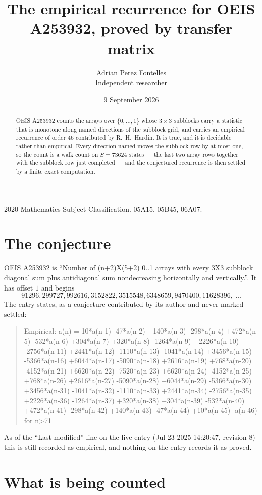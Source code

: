 \documentclass[11pt,a4paper]{article}
\title{The empirical recurrence for OEIS A253932, proved by transfer matrix}
\author{Adrian Perez Fontelles\\ \small Independent researcher}
\date{9 September 2026}
\theoremstyle{plain}
\theoremstyle{definition}
\begin{document}
\maketitle

\begin{abstract}
OEIS A253932 counts the arrays over $\{0,\dots,1\}$ whose $3\times3$ subblocks carry a
statistic that is monotone along named directions of the subblock grid, and carries an
empirical recurrence of order $46$ contributed by R.~H.~Hardin. It is true, and it is
decidable rather than empirical. Every direction named moves the subblock row by at most one,
so the count is a walk count on $S=73624$ states --- the last two array rows together with the
subblock row just completed --- and the conjectured recurrence is then settled by a finite
exact computation.
\end{abstract}

\noindent\small 2020 Mathematics Subject Classification. 05A15, 05B45, 06A07.\normalsize

\section{The conjecture}

OEIS A253932 is ``Number of (n+2)X(5+2) 0..1 arrays with every 3X3 subblock diagonal sum plus antidiagonal sum nondecreasing horizontally and vertically.''. It has offset $1$ and begins
\[
91296, 299727, 992616, 3152822, 3515548, 6348659, 9470400, 11628396,\ \dots
\]
The entry states, as a conjecture contributed by its author and never marked settled:
\begin{quote}
Empirical: a(n) = 10*a(n-1) -47*a(n-2) +140*a(n-3) -298*a(n-4) +472*a(n-5) -532*a(n-6) +304*a(n-7) +320*a(n-8) -1264*a(n-9) +2226*a(n-10) -2756*a(n-11) +2441*a(n-12) -1110*a(n-13) -1041*a(n-14) +3456*a(n-15) -5366*a(n-16) +6044*a(n-17) -5090*a(n-18) +2616*a(n-19) +768*a(n-20) -4152*a(n-21) +6620*a(n-22) -7520*a(n-23) +6620*a(n-24) -4152*a(n-25) +768*a(n-26) +2616*a(n-27) -5090*a(n-28) +6044*a(n-29) -5366*a(n-30) +3456*a(n-31) -1041*a(n-32) -1110*a(n-33) +2441*a(n-34) -2756*a(n-35) +2226*a(n-36) -1264*a(n-37) +320*a(n-38) +304*a(n-39) -532*a(n-40) +472*a(n-41) -298*a(n-42) +140*a(n-43) -47*a(n-44) +10*a(n-45) -a(n-46) for n>71
\end{quote}
As of the ``Last modified'' line on the live entry (Jul 23 2025 14:20:47, revision 8) this is still
recorded as empirical, and nothing on the entry records it as proved.

\section{What is being counted}
\end{document}
